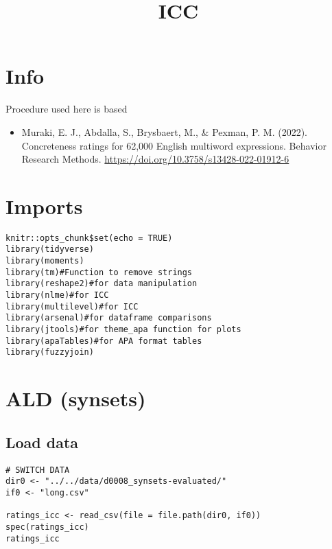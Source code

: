 \documentclass[a4paper,10pt,onecolumn,oneside,openright]{article}
\date{}
\title{ICC}
\begin{document}
\maketitle


\section{Info}
\label{sec:org9e4b004}
Procedure used here is based \textcite{MurakiEtAl2022pub}
\begin{itemize}
\item Muraki, E. J., Abdalla, S., Brysbaert, M., \& Pexman, P. M. (2022).
Concreteness ratings for 62,000 English multiword expressions. Behavior
Research Methods. \url{https://doi.org/10.3758/s13428-022-01912-6}
\end{itemize}
\section{Imports}
\label{sec:org9360618}
\begin{verbatim}
knitr::opts_chunk$set(echo = TRUE)
library(tidyverse)
library(moments)
library(tm)#Function to remove strings
library(reshape2)#for data manipulation
library(nlme)#for ICC
library(multilevel)#for ICC
library(arsenal)#for dataframe comparisons
library(jtools)#for theme_apa function for plots
library(apaTables)#for APA format tables
library(fuzzyjoin)

\end{verbatim}


\section{ALD (synsets)}
\label{sec:org2422011}
\subsection{Load data}
\label{sec:org2296a69}
\begin{verbatim}
# SWITCH DATA
dir0 <- "../../data/d0008_synsets-evaluated/"
if0 <- "long.csv"

ratings_icc <- read_csv(file = file.path(dir0, if0))
spec(ratings_icc)
ratings_icc
\end{verbatim}
\end{document}
